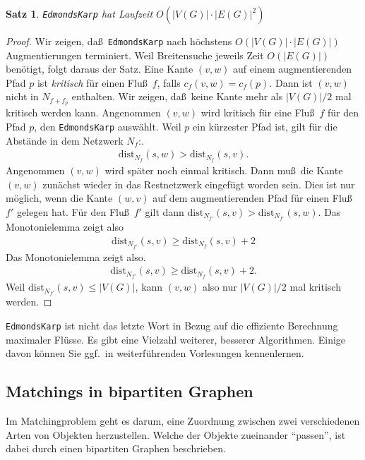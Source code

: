 \documentclass[10pt,reqno]{amsart}
\numberwithin{equation}{section}
\newcommand\alert[1]{\emph{#1}}
\newtheorem{theorem}[definition]{Satz}
\newcommand\dist{\mathrm{dist}}
\begin{document}
\begin{theorem}\label{thm_ek}
	{\tt EdmondsKarp} hat Laufzeit $O(|V(G)|\cdot|E(G)|^2)$
\end{theorem}
\begin{proof}
	Wir zeigen, da\ss\ {\tt EdmondsKarp} nach h\"ochstens $O(|V(G)|\cdot|E(G)|)$ Augmentierungen terminiert.
	Weil Breitensuche jeweils Zeit $O(|E(G)|)$ ben\"otigt, folgt daraus der Satz.
	Eine Kante $(v,w)$ auf einem augmentierenden Pfad $p$ ist \alert{kritisch} f\"ur einen Flu\ss\ $f$, falls $c_f(v,w)=c_f(p)$.
	Dann ist $(v,w)$ nicht in $N_{f+f_p}$ enthalten.
	Wir zeigen, da\ss\ keine Kante mehr als $|V(G)|/2$ mal kritisch werden kann.
	Angenommen $(v,w)$ wird kritisch f\"ur eine Flu\ss\ $f$ f\"ur den Pfad $p$, den {\tt EdmondsKarp} ausw\"ahlt.
	Weil $p$ ein k\"urzester Pfad ist, gilt f\"ur die Abst\"ande in dem Netzwerk $N_f$:.
	\begin{align*}
		\dist_{N_f}(s,w)>\dist_{N_f}(s,v).
	\end{align*}
	Angenommen $(v,w)$ wird sp\"ater noch einmal kritisch.
	Dann mu\ss\ die Kante $(v,w)$ zun\"achst wieder in das Restnetzwerk eingef\"ugt worden sein.
	Dies ist nur m\"oglich, wenn die Kante $(w,v)$ auf dem augmentierenden Pfad f\"ur einen Flu\ss\ $f'$ gelegen hat.
	F\"ur den Flu\ss\ $f'$ gilt dann $\dist_{N_{f'}}(s,v)>\dist_{N_{f'}}(s,w)$.
	Das Monotonielemma zeigt also
	\begin{align*}
		\dist_{N_{f'}}(s,v)\geq\dist_{N_f}(s,v)+2
	\end{align*}
	Das Monotonielemma zeigt also.
	\begin{align*}
		\dist_{N_{f'}}(s,v)\geq\dist_{N_f}(s,v)+2.
	\end{align*}
	Weil $\dist_{N_{f'}}(s,v)\leq|V(G)|$, kann $(v,w)$ also nur $|V(G)|/2$ mal kritisch werden.
\end{proof}

{\tt EdmondsKarp} ist nicht das letzte Wort in Bezug auf die effiziente Berechnung maximaler Fl\"usse.
Es gibt eine Vielzahl weiterer, besserer Algorithmen.
Einige davon k\"onnen Sie ggf.\ in weiterf\"uhrenden Vorlesungen kennenlernen.

\subsection{Matchings in bipartiten Graphen}\label{sec_matching}
Im Matchingproblem geht es darum, eine Zuordnung zwischen zwei verschiedenen Arten von Objekten herzustellen.
Welche der Objekte zueinander ``passen'', ist dabei durch einen bipartiten Graphen beschrieben.
\end{document}
